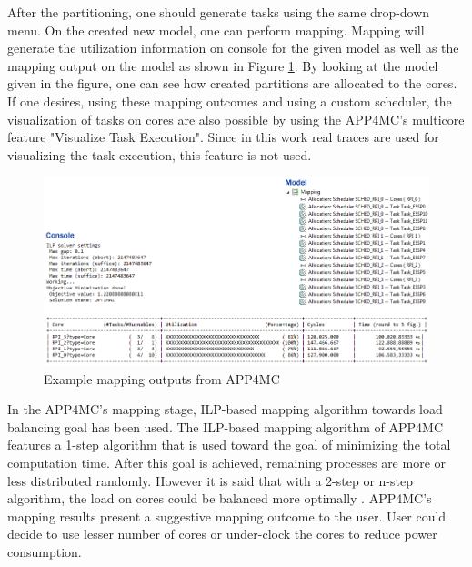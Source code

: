After the partitioning, one should generate tasks using the same drop-down menu. On the created new model, one can perform mapping. Mapping will generate the utilization information on console for the given model as well as the mapping output on the model as shown in Figure \ref{fig:mappings}. By looking at the model given in the figure, one can see how created partitions are allocated to the cores. If one desires, using these mapping outcomes and using a custom scheduler, the visualization of tasks on cores are also possible by using the APP4MC's multicore feature "Visualize Task Execution". Since in this work real traces are used for visualizing the task execution, this feature is not used.

\begin{figure}[!ht]
	\centering
	\captionsetup{justification=centering}
	\includegraphics[width=\textwidth]{content/images/mappings.png}
	\caption{Example mapping outputs from APP4MC}
	\label{fig:mappings}
\end{figure}

In the APP4MC's mapping stage, ILP-based mapping algorithm towards load balancing goal has been used. The ILP-based mapping algorithm of APP4MC features a 1-step algorithm that is used toward the goal of minimizing the total computation time. After this goal is achieved, remaining processes are more or less distributed randomly. However it is said that with a 2-step or n-step algorithm, the load on cores could be balanced more optimally \cite{mappingbook}. APP4MC's mapping results present a suggestive mapping outcome to the user. User could decide to use lesser number of cores or under-clock the cores to reduce power consumption.


